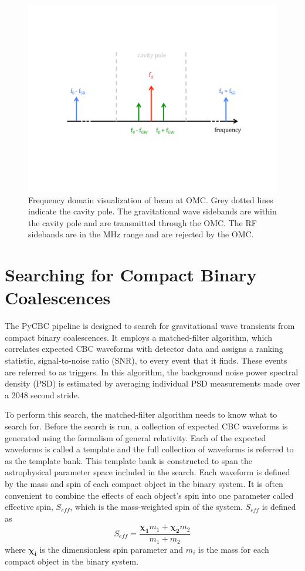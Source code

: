 \begin{figure}[ht!]
\includegraphics[width=\textwidth]{figures/introduction/omc-freq}
\caption[Sidebands and OMC cavity pole]{Frequency domain visualization of beam %
         at OMC. Grey dotted lines indicate the cavity pole. The gravitational %
         wave sidebands are within the cavity pole and are transmitted through %
         the OMC. The RF sidebands are in the MHz range and are rejected by the %
         OMC.}
\end{figure}\label{fig:omc-freq}

\section{Searching for Compact Binary Coalescences}

The PyCBC pipeline is designed to search for gravitational wave transients from compact binary
coalescences. It employs a matched-filter algorithm, which correlates
expected CBC
waveforms with detector data and assigns a ranking statistic, signal-to-noise ratio (SNR),
to every event that it finds. These events are referred to as triggers. In this algorithm,
the background noise power spectral density (PSD) is estimated by averaging individual
PSD measurements made over a 2048 second stride.

To perform this search, the matched-filter algorithm needs to know what to search for.
Before the search is run, a collection of expected CBC waveforms is generated using
the formalism of general relativity. Each of the expected waveforms is called a template and
the full collection of waveforms is referred to as the template bank. This template bank
is constructed to span the astrophysical parameter space included in the search. 
Each waveform is defined by the mass and spin of each compact
object in the binary system. It is often convenient to combine the effects of each
object's spin into one parameter called effective spin, $S_{eff}$,
which is the
mass-weighted spin of the system. $S_{eff}$ is defined as
\begin{equation}
S_{eff} = \frac{\boldsymbol{\chi_{1}}m_{1} + \boldsymbol{\chi_{2}}m_{2}}{m_{1} + m_{2}}
\end{equation}
where $\boldsymbol{\chi_{i}}$ is the dimensionless spin parameter and $m_{i}$ is the
mass for each compact object in the binary system.

